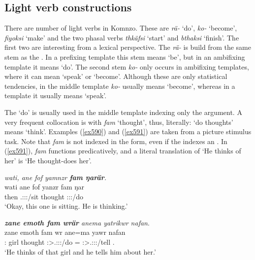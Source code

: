 \subsection{Light verb constructions}\label{lightverb}

There are number of light verbs in Komnzo. These are \emph{rä-} `do', \emph{ko-} `become', \emph{fiyoksi} `make' and the two phasal verbs \emph{thkäfsi} `start' and \emph{bthaksi} `finish'. The first two are interesting from a lexical perspective. The  \emph{rä-} is build from the same stem as the . In a prefixing template this stem means `be', but in an ambifixing template it means `do'. The second stem \emph{ko-} only occurs in ambifixing templates, where it can mean `speak' or `become'. Although these are only statistical tendencies, in the middle template \emph{ko-} usually means `become', whereas in a  template it usually means `speak'.

The  `do' is usually used in the middle template indexing only the  argument. A very frequent collocation is with \emph{fam} `thought', thus, literally: `do thoughts' means `think'. Examples (\ref{ex590}) and (\ref{ex591}) are taken from a picture stimulus task. Note that \emph{fam} is not indexed in the  form, even if the  indexes an . In (\ref{ex591}), \emph{fam} functions predicatively, and a literal translation of `He thinks of her' is `He thought-does her'.

\begin{exe}
	\ex \emph{wati, ane fof yamnzr \textbf{fam ŋarär}.}\\
	\gll wati ane fof yanzr fam ŋar\\
	then {\Dem} {\Emph} \Tsg.\Masc:\Sbj:\Nonpast:\Ipfv/sit thought \Stsg:\Sbj:\Nonpast:\Ipfv/do\\
	\trans `Okay, this one is sitting. He is thinking.'
	\label{ex590}
\end{exe}
\begin{exe}
	\ex \emph{\textbf{zane emoth fam wrär} anema yatrikwr nafan}.\\
	\gll zane emoth fam wr ane=ma yawr nafan\\
	\Dem:{\Prox} girl thought \Stsg:\Sbj>\Tsg.\F:\Obj:\Nonpast:\Ipfv/do \Dem={\Char} \Stsg:\Sbj>\Tsg.\Masc:\Io:\Nonpast:\Ipfv/tell \Tsg.\Dat\\
	\trans `He thinks of that girl and he tells him about her.'
	\label{ex591}
\end{exe}

